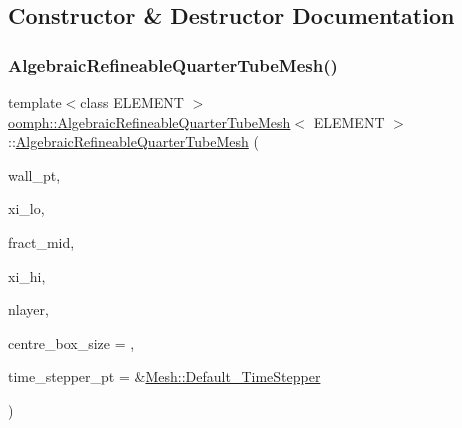 \subsection{Constructor \& Destructor Documentation}
\mbox{\label{classoomph_1_1AlgebraicRefineableQuarterTubeMesh_ad8ff9f32d4d180d815da65ddc3c4b90a}} 
\subsubsection{\texorpdfstring{Algebraic\+Refineable\+Quarter\+Tube\+Mesh()}{AlgebraicRefineableQuarterTubeMesh()}}
{\footnotesize\ttfamily template$<$class E\+L\+E\+M\+E\+NT $>$ \\
\hyperlink{classoomph_1_1AlgebraicRefineableQuarterTubeMesh}{oomph\+::\+Algebraic\+Refineable\+Quarter\+Tube\+Mesh}$<$ E\+L\+E\+M\+E\+NT $>$\+::\hyperlink{classoomph_1_1AlgebraicRefineableQuarterTubeMesh}{Algebraic\+Refineable\+Quarter\+Tube\+Mesh} (\begin{DoxyParamCaption}\item[{\hyperlink{classoomph_1_1GeomObject}{Geom\+Object} $\ast$}]{wall\+\_\+pt,  }\item[{const \hyperlink{classoomph_1_1Vector}{Vector}$<$ double $>$ \&}]{xi\+\_\+lo,  }\item[{const double \&}]{fract\+\_\+mid,  }\item[{const \hyperlink{classoomph_1_1Vector}{Vector}$<$ double $>$ \&}]{xi\+\_\+hi,  }\item[{const unsigned \&}]{nlayer,  }\item[{const double}]{centre\+\_\+box\+\_\+size = {},  }\item[{\hyperlink{classoomph_1_1TimeStepper}{Time\+Stepper} $\ast$}]{time\+\_\+stepper\+\_\+pt = {\ttfamily \&\hyperlink{classoomph_1_1Mesh_a12243d0fee2b1fcee729ee5a4777ea10}{Mesh\+::\+Default\+\_\+\+Time\+Stepper}} }\end{DoxyParamCaption})\hspace{0.3cm}{\ttfamily [inline]}}



